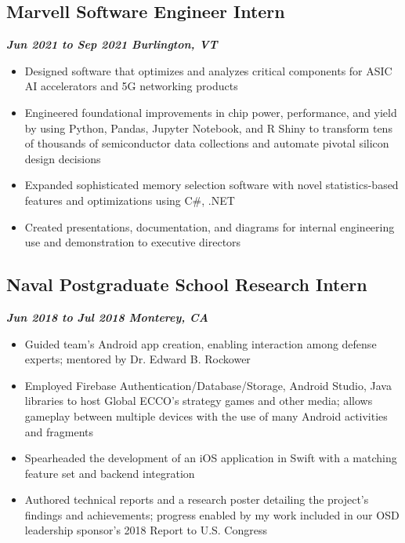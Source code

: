 \documentclass[10pt]{article}
\begin{document}
\begin{raggedright}
        \subsection*{\textbf{\large{Marvell \textendash{} Software Engineer Intern}}} \hfill \textbf{\textit{Jun 2021 to Sep 2021 \textendash{} Burlington, VT}}
        \begin{itemize}
            \item Designed software that optimizes and analyzes critical components for ASIC AI accelerators and 5G networking products
            \item Engineered foundational improvements in chip power, performance, and yield by using Python, Pandas, Jupyter Notebook, and R Shiny to transform tens of thousands of semiconductor data collections and automate pivotal silicon design decisions
            \item Expanded sophisticated memory selection software with novel statistics-based features and optimizations using C\#, .NET
            \item Created presentations, documentation, and diagrams for internal engineering use and demonstration to executive directors
        \end{itemize}

        \subsection*{\textbf{\large{Naval Postgraduate School \textendash{} Research Intern}}} \hfill \textbf{\textit{Jun 2018 to Jul 2018 \textendash{} Monterey, CA}}
        \begin{itemize}
            \item Guided team's Android app creation, enabling interaction among defense experts; mentored by Dr. Edward B. Rockower
            \item Employed Firebase Authentication/Database/Storage, Android Studio, Java libraries to host Global ECCO's strategy games and other media; allows gameplay between multiple devices with the use of many Android activities and fragments
            \item Spearheaded the development of an iOS application in Swift with a matching feature set and backend integration
            \item Authored technical reports and a research poster detailing the project's findings and achievements; progress enabled by my work included in our OSD leadership sponsor's 2018 Report to U.S. Congress
        \end{itemize}


\end{raggedright}
\end{document}
